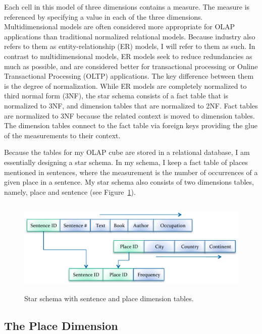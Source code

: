 Each cell in this model of three dimensions contains a measure. The measure is referenced by specifying a value in each of the three dimensions.
Multidimensional models are often considered more appropriate for OLAP applications than traditional normalized relational models. Because industry also refers
to them as entity-relationship (ER) models, I will refer to them as such. In contrast to multidimensional models, ER models seek to reduce redundancies as much
as possible, and are considered better for transactional processing or Online Transactional Processing (OLTP) applications. The key difference between them is
the degree of normalization. While ER models are completely normalized to third normal form (3NF), the star schema consists of a fact table that is
normalized to 3NF, and dimension tables that are normalized to 2NF. Fact tables are normalized to 3NF because the related context is moved to dimension tables.
The dimension tables connect to the fact table via foreign keys providing the glue of the measurements to their context.

Because the tables for my OLAP cube are stored in a relational database, I am essentially designing a star schema. In my schema, I keep a fact table of places
mentioned in sentences, where the measurement is the number of occurrences of a given place in a sentence. My star schema also consists of two dimensions
tables, namely, place and sentence (see Figure~\ref{fig:figures_MyStarSchema}).

\begin{figure}[bp]
    \centering
        \includegraphics[height=1.8in]{figures/MyStarSchema.pdf}
    \caption{Star schema with sentence and place dimension tables.}
    \label{fig:figures_MyStarSchema}
\end{figure}

\subsection{The Place Dimension} %
\label{sub:the_place_dimension}


